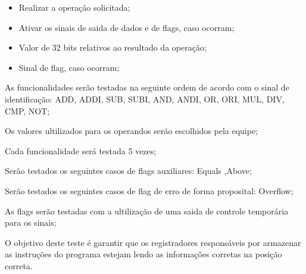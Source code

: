 \documentclass{article}
\begin{document}
  \actions
  \begin{itemize}
     \item Realizar a operação solicitada;
     \item Ativar os sinais de saida de dados e de flags, caso ocorram;
    \end{itemize}
  
  \results
  	\begin{itemize}
     \item Valor de 32 bits relativos ao resultado da operação;
     \item Sinal de flag, caso ocorram;
    \end{itemize}
  
  \begin{mainflow}
    \item As funcionalidades serão testadas na seguinte ordem de acordo com o sinal de identificação: ADD, ADDI, SUB, SUBI,
AND, ANDI, OR, ORI, MUL, DIV, CMP, NOT;
    \item Os valores ultilizados para os operandos serão escolhidos pela equipe;
    \item Cada funcionalidade será testada 5 vezes;
    \item Serão testados os seguintes casos de flags auxiliares: Equals ,Above;
    \item Serão testados os seguintes casos de flag de erro de forma proposital: Overflow;
    \item As flags serão testadas com a ultilização de uma saida de controle temporária para os sinais;
  \end{mainflow}
  
  
  
  
O objetivo deste teste é garantir que os registradores responsáveis por armazenar as instruções do programa  estejam lendo as informações corretas na posição correta.
  
\end{document}
